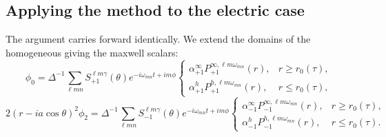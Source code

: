 \documentclass[preprint,showpacs,preprintnumbers,amssymb,superscriptaddress,aps,prd,nofootinbib,11pt]{revtex4-1}
\newcommand{\beq}{\begin{equation}}
\newcommand{\eeq}{\end{equation}}
\begin{document}
\subsection{Applying the method to the electric case}
The argument carries forward identically. We extend the domains of the homogeneous giving the maxwell scalars:
\beq
\phi_0 = \Delta^{-1} \sum_{\ell m n} S_{+1}^{\ell m \gamma}(\theta) e^{- i \omega_{mn} t + i m \phi}  
\begin{cases}
 \alpha_{+1}^{\infty} P_{+1}^{\infty , \ell m \omega_{mn}}(r) , & r \ge r_0(\tau) , \\
 \alpha_{+1}^{h} P_{+1}^{h , \ell m \omega_{mn}}(r) , & r \le r_0(\tau) , 
\end{cases}
\eeq
\beq
2 (r-i a \cos \theta)^2 \phi_2 = \Delta^{-1} \sum_{\ell m n} S_{-1}^{\ell m \gamma}(\theta) e^{- i \omega_{mn} t + i m \phi}  
\begin{cases}
 \alpha_{-1}^{\infty} P_{-1}^{\infty , \ell m \omega_{mn}}(r) , & r \ge r_0(\tau) , \\
 \alpha_{-1}^{h} P_{-1}^{h , \ell m \omega_{mn}}(r) , & r \le r_0(\tau). 
\end{cases}
\eeq



\end{document}
